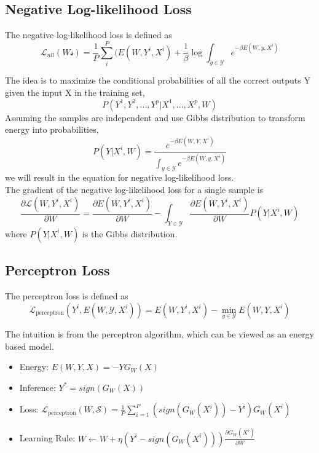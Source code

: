 \subsection{Negative Log-likelihood Loss}

The negative log-likelihood loss is defined as
\[
    \mathcal{L}_{nll}(W \mathcal{s}) = \frac{1}{P} \sum_i^P (E(W, Y^i, X^i) 
    + \frac{1}{\beta} \log \int_{y \in \mathcal{Y}} e^{-\beta E(W, y, X^i)}
\]

The idea is to maximize the conditional probabilities of all the
correct outputs Y given the input X in the training set, 
\[
    P(Y^1, Y^2, ..., Y^p |X^1, ..., X^p, W)
\]
Assuming the samples are independent and use Gibbs distribution
to transform energy into probabilities,
\[
    P(Y|X^i, W) = \frac{e^{-\beta E(W, Y, X^i)}}
    {\int_{y \in \mathcal{Y}}e^{-\beta E(W, y, X^i)}}    
\]
we will result in the equation
for negative log-likelihood loss.\\

The gradient of the negative log-likelihood loss for a single sample is 
\[
    \frac{\partial{\mathcal{L}(W, Y^i, X^i)}}{\partial{W}}
    = \frac{\partial{E(W, Y^i, X^i)}}{\partial{W}}
    - \int_{Y \in \mathcal{Y}} \frac{\partial{E(W, Y^i, X^i)}}{\partial{W}} P(Y|X^i, W)
\]
where $P(Y|X^i, W)$ is the Gibbs distribution.\\

\subsection{Perceptron Loss}

The perceptron loss is defined as 
\[
    \mathcal{\mathcal{L}}_{\text{perceptron}}(Y^i, E(W,\mathcal{Y}, X^i))
    = E(W, Y^i, X^i) - \min_{y \in \mathcal{Y}} E(W, Y, X^i)
\]

The intuition is from the perceptron algorithm,
which can be viewed as an energy based model.
\begin{itemize}
    \item Energy: $E(W, Y, X) = -YG_W(X)$
    \item Inference: $Y^* = sign(G_W(X))$
    \item Loss: $\mathcal{\mathcal{L}}_{\text{perceptron}}(W, \mathcal{S})
     = \frac{1}{P} \sum_{i=1}^P(sign(G_W(X^i))-Y^i)G_W(X^i)$
    \item Learning Rule: $W \leftarrow W + \eta (Y^i -sign(G_W(X^i)))
    \frac{\partial{G_W(X^i)}}{\partial{W}}$
\end{itemize}

